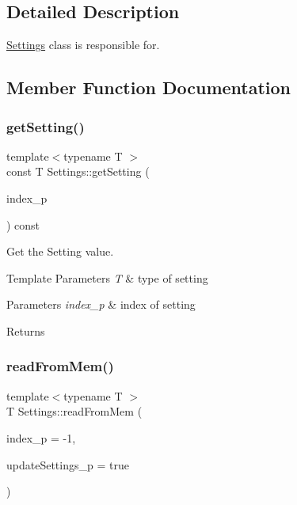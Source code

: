 \subsection{Detailed Description}
\hyperlink{class_settings}{Settings} class is responsible for. 

\subsection{Member Function Documentation}
\mbox{\label{class_settings_a61df1edd21940600c4c6647adb177a91}} 
\subsubsection{\texorpdfstring{get\+Setting()}{getSetting()}}
{\footnotesize\ttfamily template$<$typename T $>$ \\
const T Settings\+::get\+Setting (\begin{DoxyParamCaption}\item[{uint8\+\_\+t}]{index\+\_\+p }\end{DoxyParamCaption}) const\hspace{0.3cm}{\ttfamily [inline]}}



Get the Setting value. 


\begin{DoxyTemplParams}{Template Parameters}
{\em T} & type of setting \\
\hline
\end{DoxyTemplParams}

\begin{DoxyParams}{Parameters}
{\em index\+\_\+p} & index of setting \\
\hline
\end{DoxyParams}
\begin{DoxyReturn}{Returns}

\end{DoxyReturn}
\mbox{\label{class_settings_a49f0ce2f4dbff5b59f4b8658a06b49bb}} 
\subsubsection{\texorpdfstring{read\+From\+Mem()}{readFromMem()}}
{\footnotesize\ttfamily template$<$typename T $>$ \\
T Settings\+::read\+From\+Mem (\begin{DoxyParamCaption}\item[{uint16\+\_\+t}]{index\+\_\+p = {\ttfamily -\/1},  }\item[{bool}]{update\+Settings\+\_\+p = {\ttfamily true} }\end{DoxyParamCaption})\hspace{0.3cm}{\ttfamily [inline]}}



